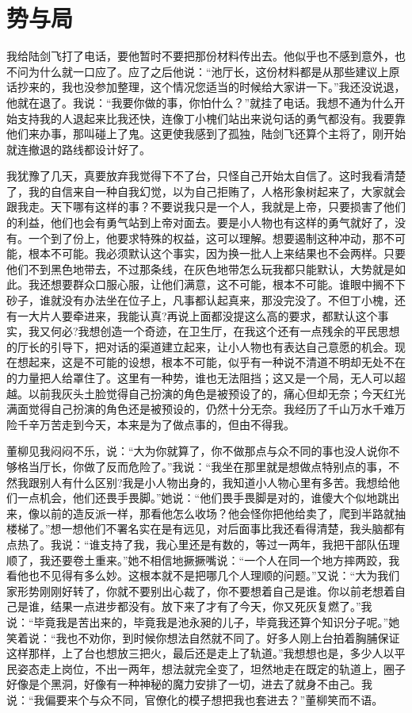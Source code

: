 \documentclass[12pt,oneside]{book}
\begin{document}
\chapter{势与局}

我给陆剑飞打了电话，要他暂时不要把那份材料传出去。他似乎也不感到意外，也不问为什么就一口应了。应了之后他说：``池厅长，这份材料都是从那些建议上原话抄来的，我也没参加整理，这个情况您适当的时候给大家讲一下。''我还没说退，他就在退了。我说：``我要你做的事，你怕什么？''就挂了电话。我想不通为什么开始支持我的人退起来比我还快，连像丁小槐们站出来说句话的勇气都没有。我要靠他们来办事，那叫碰上了鬼。这更使我感到了孤独，陆剑飞还算个主将了，刚开始就连撤退的路线都设计好了。

我犹豫了几天，真要放弃我觉得下不了台，只怪自己开始太自信了。这时我看清楚了，我的自信来自一种自我幻觉，以为自己拒贿了，人格形象树起来了，大家就会跟我走。天下哪有这样的事？不要说我只是一个人，我就是上帝，只要损害了他们的利益，他们也会有勇气站到上帝对面去。要是小人物也有这样的勇气就好了，没有。一个到了份上，他要求特殊的权益，这可以理解。想要遏制这种冲动，那不可能，根本不可能。我必须默认这个事实，因为换一批人上来结果也不会两样。只要他们不到黑色地带去，不过那条线，在灰色地带怎么玩我都只能默认，大势就是如此。我还想要群众口服心服，让他们满意，这不可能，根本不可能。谁眼中搁不下砂子，谁就没有办法坐在位子上，凡事都认起真来，那没完没了。不但丁小槐，还有一大片人要牵进来，我能认真?再说上面都没提这么高的要求，都默认这个事实，我又何必?我想创造一个奇迹，在卫生厅，在我这个还有一点残余的平民思想的厅长的引导下，把对话的渠道建立起来，让小人物也有表达自己意愿的机会。现在想起来，这是不可能的设想，根本不可能，似乎有一种说不清道不明却无处不在的力量把人给罩住了。这里有一种势，谁也无法阻挡；这又是一个局，无人可以超越。以前我灰头土脸觉得自己扮演的角色是被预设了的，痛心但却无奈；今天红光满面觉得自己扮演的角色还是被预设的，仍然十分无奈。我经历了千山万水千难万险千辛万苦走到今天，本来是为了做点事的，但由不得我。

董柳见我闷闷不乐，说：``大为你就算了，你不做那点与众不同的事也没人说你不够格当厅长，你做了反而危险了。''我说：``我坐在那里就是想做点特别点的事，不然我跟别人有什么区别?我是小人物出身的，我知道小人物心里有多苦。我想给他们一点机会，他们还畏手畏脚。''她说：``他们畏手畏脚是对的，谁傻大个似地跳出来，像以前的造反派一样，那看他怎么收场？他会怪你把他给卖了，爬到半路就抽楼梯了。''想一想他们不署名实在是有远见，对后面事比我还看得清楚，我头脑都有点热了。我说：``谁支持了我，我心里还是有数的，等过一两年，我把干部队伍理顺了，我还要卷土重来。''她不相信地撅撅嘴说：``一个人在同一个地方摔两跤，我看他也不见得有多么妙。这根本就不是把哪几个人理顺的问题。''又说：``大为我们家形势刚刚好转了，你就不要别出心裁了，你不要想着自己是谁。你以前老想着自己是谁，结果一点进步都没有。放下来了才有了今天，你又死灰复燃了。''我说：``毕竟我是苦出来的，毕竟我是池永昶的儿子，毕竟我还算个知识分子呢。''她笑着说：``我也不劝你，到时候你想法自然就不同了。好多人刚上台拍着胸脯保证这样那样，上了台也想放三把火，最后还是走上了轨道。''我想想也是，多少人以平民姿态走上岗位，不出一两年，想法就完全变了，坦然地走在既定的轨道上，圈子好像是个黑洞，好像有一种神秘的魔力安排了一切，进去了就身不由己。我说：``我偏要来个与众不同，官僚化的模子想把我也套进去？''董柳笑而不语。
\end{document}
